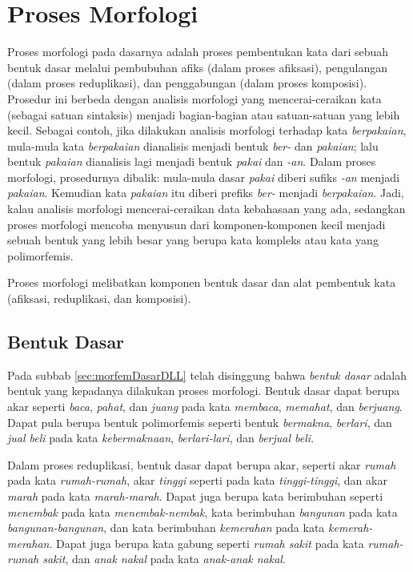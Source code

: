 \section{Proses Morfologi}
\label{sec:prosesMorfologi}

Proses morfologi pada dasarnya adalah proses pembentukan kata dari sebuah bentuk dasar melalui pembubuhan afiks (dalam proses afiksasi), pengulangan (dalam proses reduplikasi), dan penggabungan (dalam proses komposisi)\cite{chaer:08:morfologi}. Prosedur ini berbeda dengan analisis morfologi yang mencerai-ceraikan kata (sebagai satuan sintaksis) menjadi bagian-bagian atau satuan-satuan yang lebih kecil. Sebagai contoh, jika dilakukan analisis morfologi terhadap kata \textit{berpakaian}, mula-mula kata \textit{berpakaian} dianalisis menjadi bentuk \textit{ber-} dan \textit{pakaian}; lalu bentuk \textit{pakaian} dianalisis lagi menjadi bentuk \textit{pakai} dan \textit{-an}. Dalam proses morfologi, prosedurnya dibalik: mula-mula dasar \textit{pakai} diberi sufiks \textit{-an} menjadi \textit{pakaian}. Kemudian kata \textit{pakaian} itu diberi prefiks \textit{ber-} menjadi \textit{berpakaian}. Jadi, kalau analisis morfologi mencerai-ceraikan data kebahasaan yang ada, sedangkan proses morfologi mencoba menyusun dari komponen-komponen kecil menjadi sebuah bentuk yang lebih besar yang berupa kata kompleks atau kata yang polimorfemis.

Proses morfologi melibatkan komponen bentuk dasar dan alat pembentuk kata (afiksasi, reduplikasi, dan komposisi).%


\subsection{Bentuk Dasar}
\label{sec:bentukDasar}

Pada subbab \ref{sec:morfemDasarDLL} telah disinggung bahwa \textit{bentuk dasar} adalah bentuk yang kepadanya dilakukan proses morfologi. Bentuk dasar dapat berupa akar seperti \textit{baca}, \textit{pahat}, dan \textit{juang} pada kata \textit{membaca}, \textit{memahat}, dan \textit{berjuang}. Dapat pula berupa bentuk polimorfemis seperti bentuk \textit{bermakna}, \textit{berlari}, dan \textit{jual beli} pada kata \textit{kebermaknaan}, \textit{berlari-lari}, dan \textit{berjual beli}.

Dalam proses reduplikasi, bentuk dasar dapat berupa akar, seperti akar \textit{rumah} pada kata \textit{rumah-rumah}, akar \textit{tinggi} seperti pada kata \textit{tinggi-tinggi}, dan akar \textit{marah} pada kata \textit{marah-marah}. Dapat juga berupa kata berimbuhan seperti \textit{menembak} pada kata \textit{menembak-nembak}, kata berimbuhan \textit{bangunan} pada kata \textit{bangunan-bangunan}, dan kata berimbuhan \textit{kemerahan} pada kata \textit{kemerah-merahan}. Dapat juga berupa kata gabung seperti \textit{rumah sakit} pada kata \textit{rumah-rumah sakit}, dan \textit{anak nakal} pada kata \textit{anak-anak nakal}.

